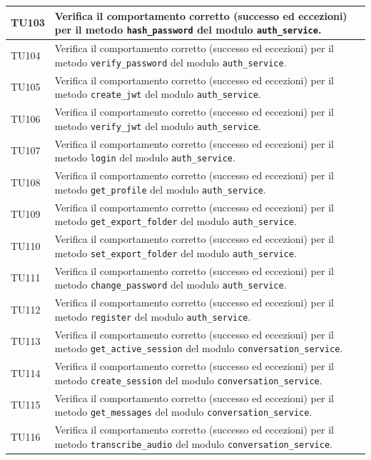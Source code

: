 \documentclass[a4paper,11pt,oneside]{scrartcl}
\begin{document}
\begin{longtable}{|p{1.9cm}|p{11.6cm}|c|}
TU103 & Verifica il comportamento corretto (successo ed eccezioni) per il metodo \texttt{hash\_password} del modulo \texttt{auth\_service}. & \\ \hline
TU104 & Verifica il comportamento corretto (successo ed eccezioni) per il metodo \texttt{verify\_password} del modulo \texttt{auth\_service}. & \\ \hline
TU105 & Verifica il comportamento corretto (successo ed eccezioni) per il metodo \texttt{create\_jwt} del modulo \texttt{auth\_service}. & \\ \hline
TU106 & Verifica il comportamento corretto (successo ed eccezioni) per il metodo \texttt{verify\_jwt} del modulo \texttt{auth\_service}. & \\ \hline
TU107 & Verifica il comportamento corretto (successo ed eccezioni) per il metodo \texttt{login} del modulo \texttt{auth\_service}. & \\ \hline
TU108 & Verifica il comportamento corretto (successo ed eccezioni) per il metodo \texttt{get\_profile} del modulo \texttt{auth\_service}. & \\ \hline
TU109 & Verifica il comportamento corretto (successo ed eccezioni) per il metodo \texttt{get\_export\_folder} del modulo \texttt{auth\_service}. & \\ \hline
TU110 & Verifica il comportamento corretto (successo ed eccezioni) per il metodo \texttt{set\_export\_folder} del modulo \texttt{auth\_service}. & \\ \hline
TU111 & Verifica il comportamento corretto (successo ed eccezioni) per il metodo \texttt{change\_password} del modulo \texttt{auth\_service}. & \\ \hline
TU112 & Verifica il comportamento corretto (successo ed eccezioni) per il metodo \texttt{register} del modulo \texttt{auth\_service}. & \\ \hline
TU113 & Verifica il comportamento corretto (successo ed eccezioni) per il metodo \texttt{get\_active\_session} del modulo \texttt{conversation\_service}. & \\ \hline
TU114 & Verifica il comportamento corretto (successo ed eccezioni) per il metodo \texttt{create\_session} del modulo \texttt{conversation\_service}. & \\ \hline
TU115 & Verifica il comportamento corretto (successo ed eccezioni) per il metodo \texttt{get\_messages} del modulo \texttt{conversation\_service}. & \\ \hline
TU116 & Verifica il comportamento corretto (successo ed eccezioni) per il metodo \texttt{transcribe\_audio} del modulo \texttt{conversation\_service}. & \\ \hline

\end{longtable}
\end{document}

